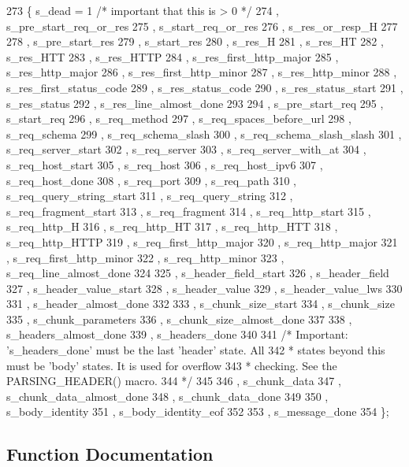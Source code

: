 \begin{DoxyCode}
273   \{ s_dead = 1 \textcolor{comment}{/* important that this is > 0 */}
274   , s_pre_start_req_or_res
275   , s_start_req_or_res
276   , s_res_or_resp_H
277 
278   , s_pre_start_res
279   , s_start_res
280   , s_res_H
281   , s_res_HT
282   , s_res_HTT
283   , s_res_HTTP
284   , s_res_first_http_major
285   , s_res_http_major
286   , s_res_first_http_minor
287   , s_res_http_minor
288   , s_res_first_status_code
289   , s_res_status_code
290   , s_res_status_start
291   , s_res_status
292   , s_res_line_almost_done
293 
294   , s_pre_start_req
295   , s_start_req
296   , s_req_method
297   , s_req_spaces_before_url
298   , s_req_schema
299   , s_req_schema_slash
300   , s_req_schema_slash_slash
301   , s_req_server_start
302   , s_req_server
303   , s_req_server_with_at
304   , s_req_host_start
305   , s_req_host
306   , s_req_host_ipv6
307   , s_req_host_done
308   , s_req_port
309   , s_req_path
310   , s_req_query_string_start
311   , s_req_query_string
312   , s_req_fragment_start
313   , s_req_fragment
314   , s_req_http_start
315   , s_req_http_H
316   , s_req_http_HT
317   , s_req_http_HTT
318   , s_req_http_HTTP
319   , s_req_first_http_major
320   , s_req_http_major
321   , s_req_first_http_minor
322   , s_req_http_minor
323   , s_req_line_almost_done
324 
325   , s_header_field_start
326   , s_header_field
327   , s_header_value_start
328   , s_header_value
329   , s_header_value_lws
330 
331   , s_header_almost_done
332 
333   , s_chunk_size_start
334   , s_chunk_size
335   , s_chunk_parameters
336   , s_chunk_size_almost_done
337 
338   , s_headers_almost_done
339   , s_headers_done
340 
341   \textcolor{comment}{/* Important: 's\_headers\_done' must be the last 'header' state. All}
342 \textcolor{comment}{   * states beyond this must be 'body' states. It is used for overflow}
343 \textcolor{comment}{   * checking. See the PARSING\_HEADER() macro.}
344 \textcolor{comment}{   */}
345 
346   , s_chunk_data
347   , s_chunk_data_almost_done
348   , s_chunk_data_done
349 
350   , s_body_identity
351   , s_body_identity_eof
352 
353   , s_message_done
354   \};
\end{DoxyCode}


\subsection{Function Documentation}
